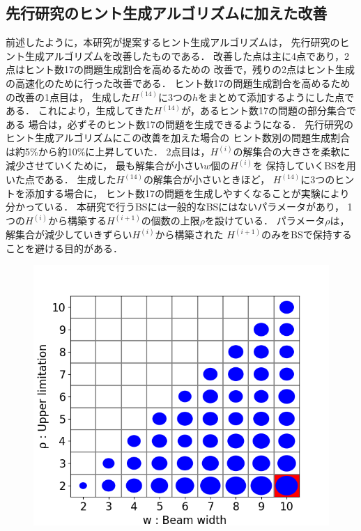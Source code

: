 \documentclass[a4paper, 9pt]{jarticle}
\begin{document}
\begin{論文概要}
\section{先行研究のヒント生成アルゴリズムに加えた改善}
前述したように，本研究が提案するヒント生成アルゴリズムは，
先行研究のヒント生成アルゴリズムを改善したものである．
改善した点は主に4点であり，2点はヒント数17の問題生成割合を高めるための
改善で，残りの2点はヒント生成の高速化のために行った改善である．
ヒント数17の問題生成割合を高めるための改善の1点目は，
生成した$H^{(14)}$に3つの$h$をまとめて添加するようにした点である．
これにより，生成してきた$H^{(14)}$が，あるヒント数17の問題の部分集合である
場合は，必ずそのヒント数17の問題を生成できるようになる．
先行研究のヒント生成アルゴリズムにこの改善を加えた場合の
ヒント数別の問題生成割合は約5\%から約10\%に上昇していた．
2点目は，$H^{(i)}$の解集合の大きさを柔軟に減少させていくために，
最も解集合が小さい$w$個の$H^{(i)}$を
保持していくBSを用いた点である．
生成した$H^{(14)}$の解集合が小さいときほど，
$H^{(14)}$に3つのヒントを添加する場合に，
ヒント数17の問題を生成しやすくなることが実験により分かっている．
本研究で行うBSには一般的なBSにはないパラメータがあり，
1つの$H^{(i)}$から構築する$H^{(i+1)}$の個数の上限$\rho$を設けている．
パラメータ$\rho$は，解集合が減少していきずらい$H^{(i)}$から構築された
$H^{(i+1)}$のみをBSで保持することを避ける目的がある．
\begin{figure}[bt]
  \vspace{-3mm}
  \centering
  \includegraphics[keepaspectratio, scale=0.4]{best_beam_width_and_rho.png}

\end{figure}
\end{論文概要}
\end{document}
